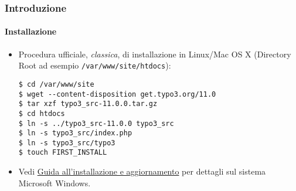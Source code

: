 %

\begin{frame}[fragile]
	\frametitle{Introduzione}
	\framesubtitle{Installazione}


	\begin{itemize}
		\item Procedura ufficiale, \textit{classica}, di installazione in Linux/Mac OS X\newline
			(Directory Root ad esempio \texttt{/var/www/site/htdocs}):
\begin{lstlisting}
$ cd /var/www/site
$ wget --content-disposition get.typo3.org/11.0
$ tar xzf typo3_src-11.0.0.tar.gz
$ cd htdocs
$ ln -s ../typo3_src-11.0.0 typo3_src
$ ln -s typo3_src/index.php
$ ln -s typo3_src/typo3
$ touch FIRST_INSTALL
\end{lstlisting}

		\item Vedi \href{https://docs.typo3.org/m/typo3/guide-installation/master/en-us/}{Guida all'installazione e aggiornamento}
			per dettagli sul sistema Microsoft Windows.

	\end{itemize}
\end{frame}

